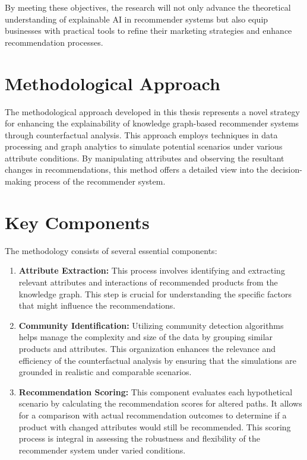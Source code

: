 By meeting these objectives, the research will not only advance the theoretical
understanding of explainable AI in recommender systems but also equip businesses
with practical tools to refine their marketing strategies and enhance
recommendation processes.

\section{Methodological Approach}

The methodological approach developed in this thesis represents a novel strategy
for enhancing the explainability of knowledge graph-based recommender systems through
counterfactual analysis. This approach employs techniques in data processing and
graph analytics to simulate potential scenarios under various attribute
conditions. By manipulating attributes and observing the resultant changes in recommendations,
this method offers a detailed view into the decision-making process of the
recommender system.

\section*{Key Components}

The methodology consists of several essential components:

\begin{enumerate}
	\item \textbf{Attribute Extraction:} This process involves identifying and
		extracting relevant attributes and interactions of recommended products from
		the knowledge graph. This step is crucial for understanding the specific factors
		that might influence the recommendations.

	\item \textbf{Community Identification:} Utilizing community detection
		algorithms helps manage the complexity and size of the data by grouping
		similar products and attributes. This organization enhances the relevance and
		efficiency of the counterfactual analysis by ensuring that the simulations are
		grounded in realistic and comparable scenarios.

	\item \textbf{Recommendation Scoring:} This component evaluates each
		hypothetical scenario by calculating the recommendation scores for altered
		paths. It allows for a comparison with actual recommendation outcomes to determine
		if a product with changed attributes would still be recommended. This
		scoring process is integral in assessing the robustness and flexibility of
		the recommender system under varied conditions.
\end{enumerate}

